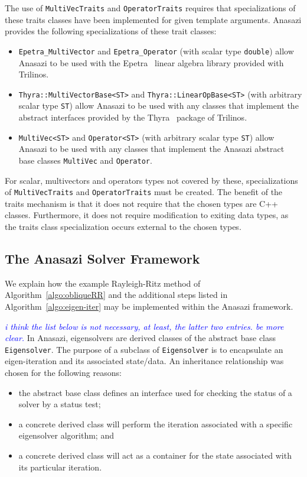 \documentclass[acmtoms]{acmtrans2m}
\newcounter{algorithm}
\newcommand{\aspace}[1]{\texttt{#1}}
\newcommand{\cbcomm}[1]{\textcolor{blue}{\emph{#1}}}
\begin{document}
The use of \aspace{MultiVecTraits} and \aspace{OperatorTraits} requires that
specializations of these traits classes have been implemented for
given template arguments. Anasazi provides the following
specializations of these trait classes:
\begin{itemize}
  \item \aspace{Epetra\_MultiVector} and \aspace{Epetra\_Operator} (with scalar type
    \aspace{double}) allow Anasazi to be used with the Epetra~\cite{Trilinos:Epetra} linear
    algebra library provided with Trilinos.
  \item \aspace{Thyra::MultiVectorBase<ST>} and
    \aspace{Thyra::LinearOpBase<ST>} (with arbitrary scalar type
    \aspace{ST}) allow Anasazi to be used with any classes that implement the abstract interfaces
    provided by the Thyra~\cite{Trilinos:Thyra} package of Trilinos.
  \item \aspace{MultiVec<ST>} and \aspace{Operator<ST>} (with
    arbitrary scalar type \aspace{ST}) allow Anasazi to be used with any classes that implement
    the Anasazi abstract base classes \aspace{MultiVec} and \aspace{Operator}.
\end{itemize}

For scalar, multivectors and operators types not covered by these,
specializations of \aspace{MultiVecTraits} and \aspace{OperatorTraits}
must be created. The benefit of the traits mechanism is that it does
not require that the chosen types are C++ classes.  Furthermore, it
does not require modification to exiting data types, as the traits
class specialization occurs external to the chosen types.


\subsection{The Anasazi Solver Framework}
\label{subsec:anasazi:solver_framework}

We explain how the example Rayleigh-Ritz method of
Algorithm~\ref{algo:obliqueRR} and the additional steps listed in
Algorithm~\ref{algo:eigen-iter} may be implemented within the Anasazi
framework.

\cbcomm{i think the list below is not necessary, at least, the latter
two entries. be more clear.}
In Anasazi, eigensolvers are derived classes of the abstract base
class \aspace{Eigensolver}. The purpose of a subclass of
\aspace{Eigensolver} is to encapsulate an eigen-iteration and
its associated state/data. An inheritance relationship was chosen for
the following reasons:
\begin{itemize}
  \item the abstract base class defines an interface used for checking the
    status of a solver by a status test;
  \item a concrete derived class will perform the iteration associated
    with a specific eigensolver algorithm; and
  \item a concrete derived class will act as a container for the state
    associated with its particular iteration.
\end{itemize}
\end{document}
